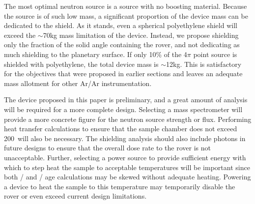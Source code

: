 \documentclass{mc2015}
\begin{document}
The most optimal neutron source is a  source with no boosting material. Because the  source is of such low mass, a significant proportion of the device mass can be dedicated to the shield. As it stands, even a spherical polyethylene shield will exceed the $\sim$70kg mass limitation of the device. Instead, we propose shielding only the fraction of the  solid angle containing the rover, and not dedicating as much shielding to the planetary surface. If only 10\% of the 4$\pi$ point source is shielded with polyethylene, the total device mass is $\sim$12kg. This is satisfactory for the objectives that were proposed in earlier sections and leaves an adequate mass allotment for other Ar/Ar instrumentation.

The device proposed in this paper is preliminary, and a great amount of analysis will be required for a more complete design. Selecting a mass spectrometer will provide a more concrete figure for the neutron source strength or flux. Performing heat transfer calculations to ensure that the sample chamber does not exceed 200\celsius\  will also be necessary. The shielding analysis should also include photons in future designs to ensure that the overall dose rate to the rover is not unacceptable. Further, selecting a power source to provide sufficient energy with which to step heat the sample to acceptable temperatures will be important since both / and / age calculations may be skewed without adequate heating.  Powering a device to heat the sample to this temperature may temporarily disable the rover or even exceed current design limitations. 
\end{document}
